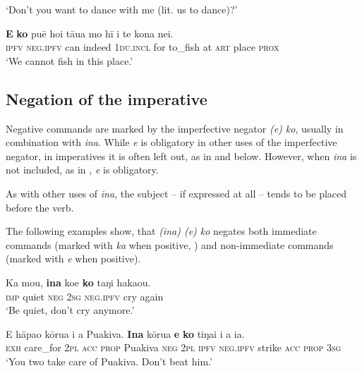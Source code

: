 \glt 
‘Don’t you want to dance with me (lit. us to dance)?’ \textstyleExampleref{[R315.115]} 
\z

\ea\label{ex:10.132}
\gll \textbf{E} \textbf{ko} puē ho{\ꞌ}i tāua mo hī {\ꞌ}i te kona nei. \\
\textsc{ipfv} \textsc{neg.ipfv} can indeed \textsc{1du.incl} for to\_fish at \textsc{art} place \textsc{prox} \\

\glt 
‘We cannot fish in this place.’ \textstyleExampleref{[R237.149]} 
\z

\subsection{Negation of the imperative}\label{sec:10.5.5}
Negative commands are marked by the imperfective negator \textit{(e) ko}, usually in combination with \textit{{\ꞌ}ina}. While \textit{e} is obligatory in other uses of the imperfective negator, in imperatives it is often left out, as in  and  below. However, when \textit{{\ꞌ}ina} is not included, as in , \textit{e} is obligatory.

As with other uses of \textit{{\ꞌ}ina}, the subject – if expressed at all – tends to be placed before the verb. 

The following examples show, that \textit{({\ꞌ}ina) (e) ko} negates both immediate commands (marked with \textit{ka} when positive, ) and non-immediate commands (marked with \textit{e} when positive).

\ea\label{ex:10.133}
\gll Ka mou, \textbf{{\ꞌ}ina} koe \textbf{ko} taŋi haka{\ꞌ}ou. \\
\textsc{imp} quiet \textsc{neg} \textsc{2sg} \textsc{neg.ipfv} cry again \\

\glt 
‘Be quiet, don’t cry anymore.’ \textstyleExampleref{[R229.343]} 
\z

\ea\label{ex:10.134}
\gll E hāpa{\ꞌ}o kōrua i a Puakiva. \textbf{{\ꞌ}Ina} kōrua \textbf{e} \textbf{ko} tiŋa{\ꞌ}i i a ia. \\
\textsc{exh} care\_for \textsc{2pl} \textsc{acc} \textsc{prop} Puakiva \textsc{neg} \textsc{2pl} \textsc{ipfv} \textsc{neg.ipfv} strike \textsc{acc} \textsc{prop} \textsc{3sg} \\

\glt 
‘You two take care of Puakiva. Don’t beat him.’ \textstyleExampleref{[R229.420]} 
\z

